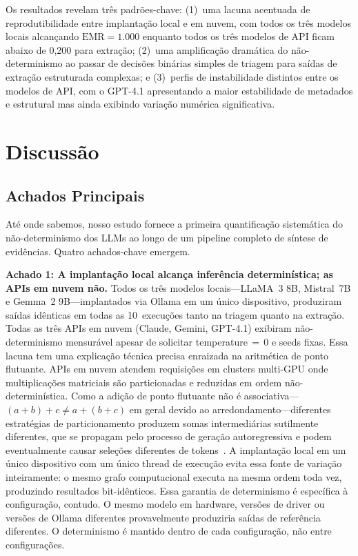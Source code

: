 \documentclass[12pt, a4paper]{article}
\newcommand{\emr}{\textrm{EMR}}
\begin{document}
\noindent Os resultados revelam três padrões-chave: (1)~uma lacuna acentuada de reprodutibilidade entre implantação local e em nuvem, com todos os três modelos locais alcançando $\emr{=}1.000$ enquanto todos os três modelos de API ficam abaixo de 0,200 para extração; (2)~uma amplificação dramática do não-determinismo ao passar de decisões binárias simples de triagem para saídas de extração estruturada complexas; e (3)~perfis de instabilidade distintos entre os modelos de API, com o GPT-4.1 apresentando a maior estabilidade de metadados e estrutural mas ainda exibindo variação numérica significativa.


\section{Discussão}

\subsection{Achados Principais}

Até onde sabemos, nosso estudo fornece a primeira quantificação sistemática do não-determinismo dos LLMs ao longo de um pipeline completo de síntese de evidências.
Quatro achados-chave emergem.

\textbf{Achado 1: A implantação local alcança inferência determinística; as APIs em nuvem não.}
Todos os três modelos locais---LLaMA~3 8B, Mistral~7B e Gemma~2 9B---implantados via Ollama em um único dispositivo, produziram saídas idênticas em todas as 10~execuções tanto na triagem quanto na extração.
Todas as três APIs em nuvem (Claude, Gemini, GPT-4.1) exibiram não-determinismo mensurável apesar de solicitar temperature$\,{=}\,$0 e seeds fixas.
Essa lacuna tem uma explicação técnica precisa enraizada na aritmética de ponto flutuante.
APIs em nuvem atendem requisições em clusters multi-GPU onde multiplicações matriciais são particionadas e reduzidas em ordem não-determinística.
Como a adição de ponto flutuante não é associativa---$(a + b) + c \neq a + (b + c)$ em geral devido ao arredondamento---diferentes estratégias de particionamento produzem somas intermediárias sutilmente diferentes, que se propagam pelo processo de geração autoregressiva e podem eventualmente causar seleções diferentes de tokens~\citep{karelin2024indeterminism}.
A implantação local em um único dispositivo com um único thread de execução evita essa fonte de variação inteiramente: o mesmo grafo computacional executa na mesma ordem toda vez, produzindo resultados bit-idênticos.
Essa garantia de determinismo é específica à configuração, contudo.
O mesmo modelo em hardware, versões de driver ou versões de Ollama diferentes provavelmente produziria saídas de referência diferentes.
O determinismo é mantido dentro de cada configuração, não entre configurações.
\end{document}
